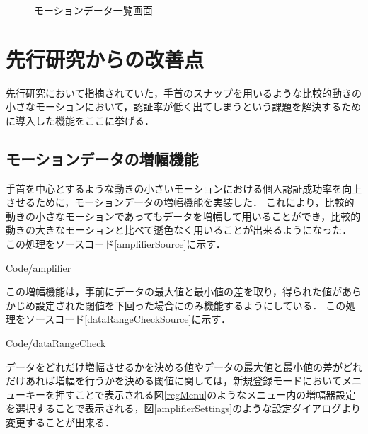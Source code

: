 \documentclass[12pt]{jreport}
\renewcommand{\slash}{/}
\begin{document}
\begin{figure}[tbp]
\begin{minipage}{0.5\hsize}
\begin{center}
                \end{center}
                \caption{モーションデータ一覧画面}
                \label{dataList}
            \end{minipage}
        \end{figure}

    \section{先行研究からの改善点}
    先行研究において指摘されていた，手首のスナップを用いるような比較的動きの小さなモーションにおいて，認証率が低く出てしまうという課題を解決するために導入した機能をここに挙げる．

        \subsection{モーションデータの増幅機能}
        手首を中心とするような動きの小さいモーションにおける個人認証成功率を向上させるために，モーションデータの増幅機能を実装した．
        これにより，比較的動きの小さなモーションであってもデータを増幅して用いることができ，比較的動きの大きなモーションと比べて遜色なく用いることが出来るようになった．
        この処理をソースコード\ref{amplifierSource}に示す．

        
        {Code\slash amplifier}

        この増幅機能は，事前にデータの最大値と最小値の差を取り，得られた値があらかじめ設定された閾値を下回った場合にのみ機能するようにしている．
        この処理をソースコード\ref{dataRangeCheckSource}に示す．

        
        {Code\slash dataRangeCheck}

        データをどれだけ増幅させるかを決める値やデータの最大値と最小値の差がどれだけあれば増幅を行うかを決める閾値に関しては，新規登録モードにおいてメニューキーを押すことで表示される図\ref{regMenu}のようなメニュー内の増幅器設定を選択することで表示される，図\ref{amplifierSettings}のような設定ダイアログより変更することが出来る．
\end{document}
